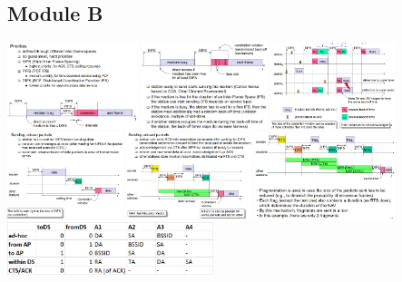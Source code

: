 \documentclass[10pt,a4paper,landscape]{article}
\begin{document}
\begin{multicols*}{4}
\section{Module B}
\begin{colfig}
  \includegraphics[height=2.5cm]{images/mod-b-slide-16.png}
  \includegraphics[height=2.5cm]{images/mod-b-slide-17.png}
  \includegraphics[height=2.5cm]{images/mod-b-slide-18.png}
  \includegraphics[height=2.5cm]{images/mod-b-slide-19.png}
  \includegraphics[height=2.5cm]{images/mod-b-slide-20.png}
  \includegraphics[height=2.5cm]{images/mod-b-slide-21.png}
  \includegraphics[width=6cm]{images/mod-b-tab-addr.png}
\end{colfig}



\end{multicols*}
\end{document}
